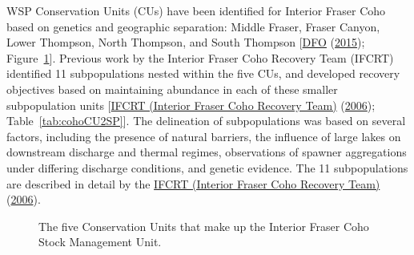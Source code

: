 \documentclass[11pt]{book}
\begin{document}
WSP Conservation Units (CUs) have been identified for Interior Fraser Coho based on genetics and geographic separation: Middle Fraser, Fraser Canyon, Lower Thompson, North Thompson, and South Thompson {[}\protect\hyperlink{ref-dfoWildSalmonPolicy2015}{DFO} (\protect\hyperlink{ref-dfoWildSalmonPolicy2015}{2015}); Figure~\ref{fig:coho-map}{]}. Previous work by the Interior Fraser Coho Recovery Team (IFCRT) identified 11 subpopulations nested within the five CUs, and developed recovery objectives based on maintaining abundance in each of these smaller subpopulation units {[}\protect\hyperlink{ref-ifcrtinteriorfrasercohorecoveryteamConservationStrategyCoho2006}{IFCRT (Interior Fraser Coho Recovery Team)} (\protect\hyperlink{ref-ifcrtinteriorfrasercohorecoveryteamConservationStrategyCoho2006}{2006}); Table~\ref{tab:cohoCU2SP}{]}. The delineation of subpopulations was based on several factors, including the presence of natural barriers, the influence of large lakes on downstream discharge and thermal regimes, observations of spawner aggregations under differing discharge conditions, and genetic evidence. The 11 subpopulations are described in detail by the \protect\hyperlink{ref-ifcrtinteriorfrasercohorecoveryteamConservationStrategyCoho2006}{IFCRT (Interior Fraser Coho Recovery Team)} (\protect\hyperlink{ref-ifcrtinteriorfrasercohorecoveryteamConservationStrategyCoho2006}{2006}).
\begin{figure}[htb]

{\centering {} 

}

\caption{The five Conservation Units that make up the Interior Fraser Coho Stock Management Unit.}\label{fig:coho-map}
\end{figure}
\end{document}
